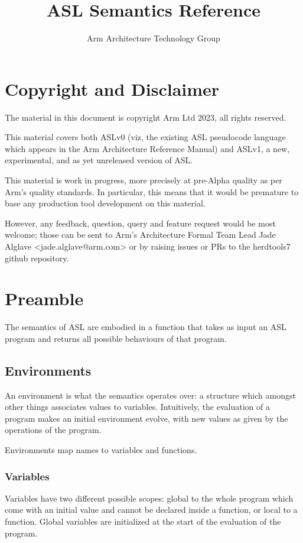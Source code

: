 \documentclass{book}
\author{Arm Architecture Technology Group}
\title{ASL Semantics Reference}
\begin{document}
\maketitle
\tableofcontents{}

\chapter{Copyright and Disclaimer}

The material in this document is copyright Arm Ltd 2023, all rights reserved.

This material covers both ASLv0 (viz, the existing ASL pseudocode language
which appears in the Arm Architecture Reference Manual) and ASLv1, a new,
experimental, and as yet unreleased version of ASL.

This material is work in progress, more precisely at pre-Alpha quality as
per Arm’s quality standards. In particular, this means that it would be
premature to base any production tool development on this material.

However, any feedback, question, query and feature request would be most
welcome; those can be sent to Arm’s Architecture Formal Team Lead Jade
Alglave <jade.alglave@arm.com> or by raising issues or PRs to the herdtools7
github repository.

\chapter{Preamble}

The semantics of ASL are embodied in a function that takes as input an ASL program
and returns all possible behaviours of that program.

\section{Environments}

An environment is what the semantics operates over: a structure
which amongst other things associates values to variables.
Intuitively, the evaluation of a program makes an initial
environment evolve, with new values as given by the operations
of the program.

Environments map names to variables and functions. 

\subsection{Variables}
Variables have two different possible scopes: global to the whole program which
come with an initial value and cannot be declared inside a function, or local
to a function. Global variables are initialized at the start of the evaluation
of the program.  
\end{document}
